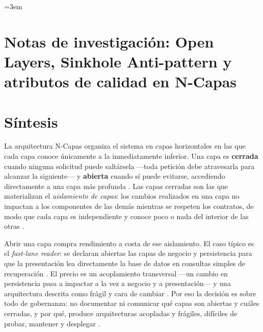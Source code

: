
\begingroup\emergencystretch=3em 
\section*{Notas de investigación: Open Layers, Sinkhole Anti-pattern y atributos de calidad en N-Capas}

\section{Síntesis}

La arquitectura N-Capas organiza el sistema en capas horizontales en las que cada capa conoce
únicamente a la inmediatamente inferior. Una capa es \textbf{cerrada} cuando ninguna solicitud
puede saltársela —toda petición debe atravesarla para alcanzar la siguiente— y \textbf{abierta}
cuando sí puede evitarse, accediendo directamente a una capa más profunda
\parencite[3]{richards2015}. Las capas cerradas son las que materializan el \emph{aislamiento de
capas}: los cambios realizados en una capa no impactan a los componentes de las demás mientras
se respeten los contratos, de modo que cada capa es independiente y conoce poco o nada del
interior de las otras \parencite[3-4]{richards2015}.

Abrir una capa compra rendimiento a costa de ese aislamiento. El caso típico es el
\emph{fast-lane reader}: se declaran abiertas las capas de negocio y persistencia para que la
presentación lea directamente la base de datos en consultas simples de recuperación
\parencite[cap.~10]{richardsford2020}. El precio es un acoplamiento transversal —un cambio en
persistencia pasa a impactar a la vez a negocio y a presentación— y una arquitectura
descrita como frágil y cara de cambiar \parencite[4]{richards2015}. Por eso la decisión es
sobre todo de gobernanza: no documentar ni comunicar qué capas son abiertas y cuáles cerradas,
y por qué, produce arquitecturas acopladas y frágiles, difíciles de probar, mantener y desplegar
\parencite[5]{richards2015}.

